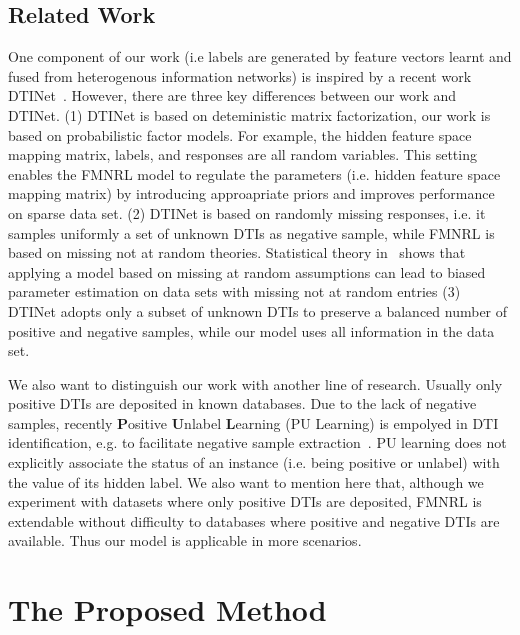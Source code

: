 \documentclass[sigconf,anonymous]{acmart}
\begin{document}
\subsection{Related Work}
One component of our work (i.e labels are generated by feature vectors learnt and fused from heterogenous information networks) is inspired by a recent work DTINet~\cite{Luo2017Network}. However, there are three key differences between our work and DTINet. (1) DTINet is based on deteministic matrix factorization, our work is based on probabilistic factor models. For example, the hidden feature space mapping matrix, labels, and responses are all random variables. This setting enables the FMNRL model to regulate the parameters (i.e. hidden feature space mapping matrix) by introducing approapriate priors and improves performance on sparse data set. (2) DTINet is based on randomly missing responses, i.e. it samples uniformly a set of unknown DTIs as negative sample, while FMNRL is based on missing not at random theories. Statistical theory in~\cite{Little1987Statistical} shows that applying a model based on missing at random assumptions can lead to biased parameter estimation on data sets with missing not at random entries (3) DTINet adopts only a subset of unknown DTIs to preserve a balanced number of positive and negative samples, while our model uses all information in the data set.

We also want to distinguish our work with another line of research. Usually only positive DTIs are deposited in known databases. Due to the lack of negative samples, recently \textbf{P}ositive \textbf{U}nlabel \textbf{L}earning (PU Learning) is empolyed in DTI identification, e.g. to facilitate negative sample extraction~\cite{Peng2017Screening}. PU learning does not explicitly associate the status of an instance (i.e. being positive or unlabel) with the value of its hidden label. We also want to mention here that, although we experiment with datasets where only positive DTIs are deposited, FMNRL is extendable without difficulty to databases where positive and negative DTIs are available. Thus our model is applicable in more scenarios.    







\section{The Proposed Method}\label{sec:method}
\end{document}
